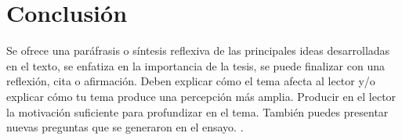 \documentclass[runningheads]{llncs}
\begin{document}
\section{Conclusión}
Se ofrece una paráfrasis o síntesis reflexiva de las principales ideas desarrolladas en el texto, se enfatiza en la importancia de la tesis, se puede finalizar con una reflexión, cita o afirmación. Deben explicar cómo el tema afecta al lector y/o explicar cómo tu tema produce una percepción más amplia. Producir en el lector la motivación suficiente para profundizar en el tema. También puedes presentar nuevas preguntas que se generaron en el ensayo. \cite{web1}.


\medskip


\end{document}
